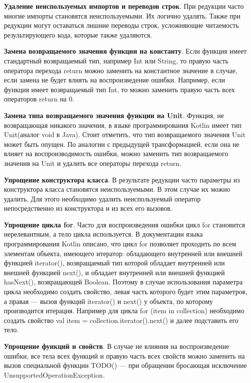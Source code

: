 \textbf{Удаление неиспользуемых импортов и переводов строк}. При редукции часто многие импорты становятся неиспользуемыми. Их логично удалять. Также при редукции могут оставаться лишние переводы строк, усложняющие читаемость результирующего кода, которые также удаляются.

\textbf{Замена возвращаемого значения функции на константу}. Если функция имеет стандартный возвращаемый тип, например Int или String, то правую часть оператора перехода return можно заменить на константное значение в случае, если замена не будет влиять на воспроизведение ошибки. Например, если функция имеет возвращаемый тип Int, то можно заменить правую часть всех операторов return на 0.

\textbf{Замена типа возвращаемого значения функции на Unit}. Функция, не возвращающая никакого значения, в языке программирования Kotlin имеет тип Unit(аналог void в Java). Стоит отметить, что тип возвращаемого значения Unit может быть опущен. По аналогии с предыдущей трансформацией, если она не влияет на воспроизводимость ошибки, можно заменить тип возвращаемого значения на Unit и удалить все операторы перехода return.

\textbf{Упрощение конструктора класса}. В результате редукции часто параметры из конструктора класса становятся неиспользуемыми. В этом случае их можно удалить. Для этого необходимо удалить неиспользуемый оператор непосредственно из конструктора и из всех его вызовов.

\textbf{Упрощение цикла for}. Часто для воспроизведения ошибки цикл for становится нерелевантным, а тело цикла используется. В документации языка программирования Kotlin описано, что цикл for позволяет проходить по всем элементам объекта, имеющего итератор:
обладающего внутренней или внешней функцией iterator(), возвращаемый тип которой обладает внутренней или внешней функцией next(), и обладает внутренней или внешней функцией hasNext(), возвращающей Boolean. Поэтому в случае использования параметра цикла необходимо создать свойство, левая часть которого будет этим параметров, а правая --- вызов функций iterator() и next() у объекта, по которому производится итерация. Например для цикла {\ttfamily for (item in collection)} необходимо создать свойство {\ttfamily val item = collection.iterator().next()} и далее подставить его тело.

\textbf{Упрощение функций и свойств}. В случае не влияния на воспроизведение ошибки, все тела всех функций и правую часть всех свойств можно заменить на вызов специальной функции TODO() --- при обращении бросающая исключение UnsupportedOperationException.

